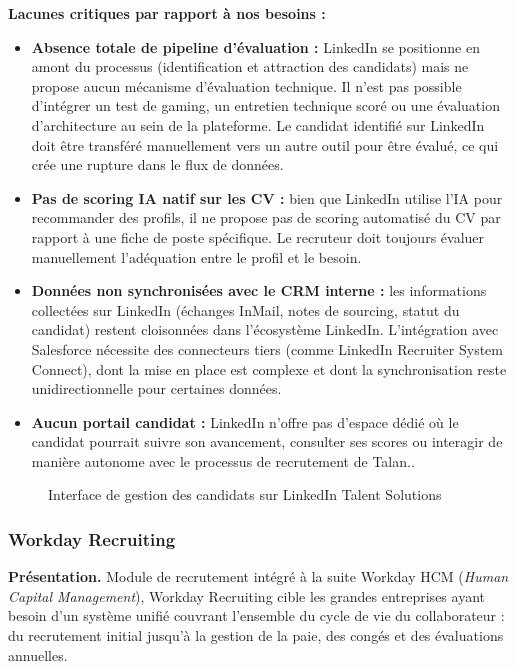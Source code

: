 \textbf{Lacunes critiques par rapport à nos besoins :}
\begin{itemize}
    \item \textbf{Absence totale de pipeline d'évaluation :} LinkedIn se positionne en amont du processus (identification et attraction des candidats) mais ne propose aucun mécanisme d'évaluation technique. Il n'est pas possible d'intégrer un test de gaming, un entretien technique scoré ou une évaluation d'architecture au sein de la plateforme. Le candidat identifié sur LinkedIn doit être transféré manuellement vers un autre outil pour être évalué, ce qui crée une rupture dans le flux de données.
    \item \textbf{Pas de scoring IA natif sur les CV :} bien que LinkedIn utilise l'IA pour recommander des profils, il ne propose pas de scoring automatisé du CV par rapport à une fiche de poste spécifique. Le recruteur doit toujours évaluer manuellement l'adéquation entre le profil et le besoin.
    \item \textbf{Données non synchronisées avec le CRM interne :} les informations collectées sur LinkedIn (échanges InMail, notes de sourcing, statut du candidat) restent cloisonnées dans l'écosystème LinkedIn. L'intégration avec Salesforce nécessite des connecteurs tiers (comme LinkedIn Recruiter System Connect), dont la mise en place est complexe et dont la synchronisation reste unidirectionnelle pour certaines données.
    \item \textbf{Aucun portail candidat :} LinkedIn n'offre pas d'espace dédié où le candidat pourrait suivre son avancement, consulter ses scores ou interagir de manière autonome avec le processus de recrutement de Talan.\parencite{URL24}.
\end{itemize}

\begin{figure}[hbt!]
    \centering
    \caption{Interface de gestion des candidats sur LinkedIn Talent Solutions}
    \label{fig:existant_linkedin}
\end{figure}

\hypertarget{Workday}{}
\subsubsection{Workday Recruiting}

\textbf{Présentation.} Module de recrutement intégré à la suite Workday HCM (\textit{Human Capital Management}), Workday Recruiting cible les grandes entreprises ayant besoin d'un système unifié couvrant l'ensemble du cycle de vie du collaborateur : du recrutement initial jusqu'à la gestion de la paie, des congés et des évaluations annuelles.

